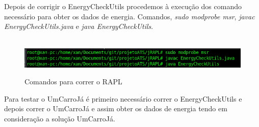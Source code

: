 Depois de corrigir o EnergyCheckUtils procedemos à execução dos comando necessário para obter os dados de energia. Comandos, \textit{sudo modprobe msr}, \textit{javac EnergyCheckUtils.java} e \textit{java EnergyCheckUtils}.

\begin{figure}[H]
    \hbox{\hspace{-8em} \includegraphics[width=1.5\textwidth]{images/rapl_run.png}}
    \label{fig51}
    \caption{Comandos para correr o RAPL}
\end{figure}

Para testar o UmCarroJá é primeiro necessário correr o EnergyCheckUtils e depois correr o UmCarroJá e assim obter os dados de energia tendo em consideração a solução UmCarroJá.

